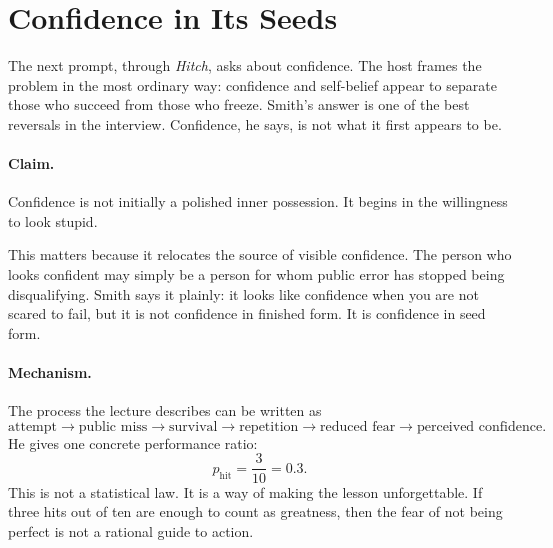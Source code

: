 \section{Confidence in Its Seeds}

The next prompt, through \emph{Hitch}, asks about confidence. The host frames the problem in the most ordinary way: confidence and self-belief appear to separate those who succeed from those who freeze. Smith's answer is one of the best reversals in the interview. Confidence, he says, is not what it first appears to be.

\paragraph{Claim.}
Confidence is not initially a polished inner possession. It begins in the willingness to look stupid.

This matters because it relocates the source of visible confidence. The person who looks confident may simply be a person for whom public error has stopped being disqualifying. Smith says it plainly: it looks like confidence when you are not scared to fail, but it is not confidence in finished form. It is confidence in seed form.

\paragraph{Mechanism.}
The process the lecture describes can be written as
\begin{equation}
\text{attempt}
\longrightarrow
\text{public miss}
\longrightarrow
\text{survival}
\longrightarrow
\text{repetition}
\longrightarrow
\text{reduced fear}
\longrightarrow
\text{perceived confidence}.
\end{equation}
He gives one concrete performance ratio:
\begin{equation}
p_{\text{hit}}=\frac{3}{10}=0.3.
\end{equation}
This is not a statistical law. It is a way of making the lesson unforgettable. If three hits out of ten are enough to count as greatness, then the fear of not being perfect is not a rational guide to action.

